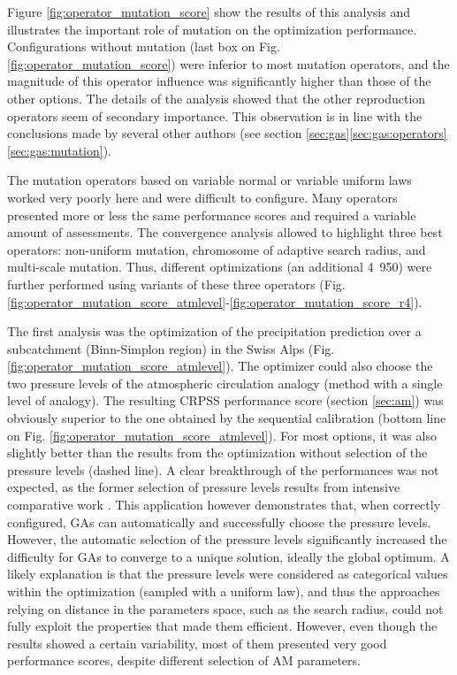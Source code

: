\documentclass{ametsoc}
\begin{document}
Figure \ref{fig:operator_mutation_score} show the results of this analysis and illustrates the important role of mutation on the optimization performance. Configurations without mutation (last box on Fig. \ref{fig:operator_mutation_score}) were inferior to most mutation operators, and the magnitude of this operator influence was significantly higher than those of the other options. The details of the analysis \citep[see][]{Horton2012a} showed that the other reproduction operators seem of secondary importance. This observation is in line with the conclusions made by several other authors (see section \ref{sec:gas}\ref{sec:gas:operators}\ref{sec:gas:mutation}).

The mutation operators based on variable normal or variable uniform laws worked very poorly here and were difficult to configure. Many operators presented more or less the same performance scores and required a variable amount of assessments. The convergence analysis \citep[see][]{Horton2012a} allowed to highlight three best operators: non-uniform mutation, chromosome of adaptive search radius, and multi-scale mutation. Thus, different optimizations (an additional 4~950) were further performed using variants of these three operators (Fig. \ref{fig:operator_mutation_score_atmlevel}-\ref{fig:operator_mutation_score_r4}).

The first analysis was the optimization of the precipitation prediction over a subcatchment (Binn-Simplon region) in the Swiss Alps (Fig. \ref{fig:operator_mutation_score_atmlevel}). The optimizer could also choose the two pressure levels of the atmospheric circulation analogy (method with a single level of analogy). The resulting CRPSS performance score (section \ref{sec:am}) was obviously superior to the one obtained by the sequential calibration (bottom line on Fig. \ref{fig:operator_mutation_score_atmlevel}). For most options, it was also slightly better than the results from the optimization without selection of the pressure levels (dashed line). A clear breakthrough of the performances was not expected, as the former selection of pressure levels results from intensive comparative work \citep{Bontron2004}. This application however demonstrates that, when correctly configured, GAs can automatically and successfully choose the pressure levels. However, the automatic selection of the pressure levels significantly increased the difficulty for GAs to converge to a unique solution, ideally the global optimum. A likely explanation is that the pressure levels were considered as categorical values within the optimization (sampled with a uniform law), and thus the approaches relying on distance in the parameters space, such as the search radius, could not fully exploit the properties that made them efficient. However, even though the results showed a certain variability, most of them presented very good performance scores, despite different selection of AM parameters.
\end{document}
